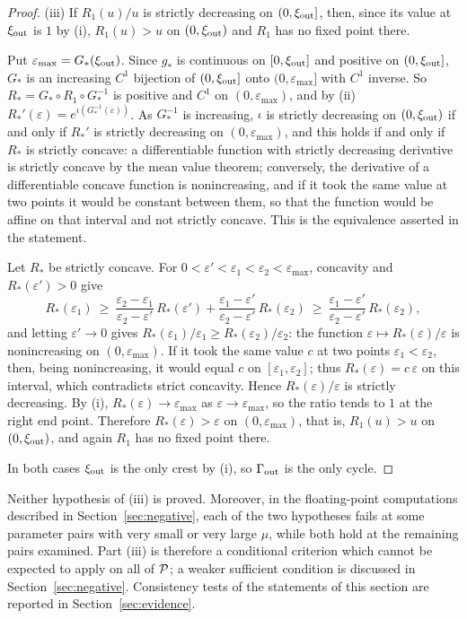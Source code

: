 \begin{proof}
(iii) If $R_1(u)/u$ is strictly decreasing on $(0,\xi_{\rm out}]$, then, since its value at $\xi_{\rm out}$ is $1$ by (i), $R_1(u)>u$ on $(0,\xi_{\rm out})$ and $R_1$ has no fixed point there.

Put $\varepsilon_{\max}=G_\ast(\xi_{\rm out})$. Since $g_\ast$ is continuous on $[0,\xi_{\rm out}]$ and positive on $(0,\xi_{\rm out}]$, $G_\ast$ is an increasing $C^1$ bijection of $(0,\xi_{\rm out}]$ onto $(0,\varepsilon_{\max}]$ with $C^1$ inverse. So $R_\ast=G_\ast\circ R_1\circ G_\ast^{-1}$ is positive and $C^1$ on $(0,\varepsilon_{\max})$, and by (ii) $R_\ast'(\varepsilon)=e^{\iota(G_\ast^{-1}(\varepsilon))}$. As $G_\ast^{-1}$ is increasing, $\iota$ is strictly decreasing on $(0,\xi_{\rm out})$ if and only if $R_\ast'$ is strictly decreasing on $(0,\varepsilon_{\max})$, and this holds if and only if $R_\ast$ is strictly concave: a differentiable function with strictly decreasing derivative is strictly concave by the mean value theorem; conversely, the derivative of a differentiable concave function is nonincreasing, and if it took the same value at two points it would be constant between them, so that the function would be affine on that interval and not strictly concave. This is the equivalence asserted in the statement.

Let $R_\ast$ be strictly concave. For $0<\varepsilon'<\varepsilon_1<\varepsilon_2<\varepsilon_{\max}$, concavity and $R_\ast(\varepsilon')>0$ give
\[
R_\ast(\varepsilon_1)\ \ge\ \frac{\varepsilon_2-\varepsilon_1}{\varepsilon_2-\varepsilon'}\,R_\ast(\varepsilon')+\frac{\varepsilon_1-\varepsilon'}{\varepsilon_2-\varepsilon'}\,R_\ast(\varepsilon_2)\ \ge\ \frac{\varepsilon_1-\varepsilon'}{\varepsilon_2-\varepsilon'}\,R_\ast(\varepsilon_2),
\]
and letting $\varepsilon'\to0$ gives $R_\ast(\varepsilon_1)/\varepsilon_1\ge R_\ast(\varepsilon_2)/\varepsilon_2$: the function $\varepsilon\mapsto R_\ast(\varepsilon)/\varepsilon$ is nonincreasing on $(0,\varepsilon_{\max})$. If it took the same value $c$ at two points $\varepsilon_1<\varepsilon_2$, then, being nonincreasing, it would equal $c$ on $[\varepsilon_1,\varepsilon_2]$; thus $R_\ast(\varepsilon)=c\,\varepsilon$ on this interval, which contradicts strict concavity. Hence $R_\ast(\varepsilon)/\varepsilon$ is strictly decreasing. By (i), $R_\ast(\varepsilon)\to\varepsilon_{\max}$ as $\varepsilon\to\varepsilon_{\max}$, so the ratio tends to $1$ at the right end point. Therefore $R_\ast(\varepsilon)>\varepsilon$ on $(0,\varepsilon_{\max})$, that is, $R_1(u)>u$ on $(0,\xi_{\rm out})$, and again $R_1$ has no fixed point there.

In both cases $\xi_{\rm out}$ is the only crest by (i), so $\Gamma_{\rm out}$ is the only cycle.
\end{proof}
Neither hypothesis of (iii) is proved. Moreover, in the floating-point computations described in Section~\ref{sec:negative}, each of the two hypotheses fails at some parameter pairs with very small or very large $\mu$, while both hold at the remaining pairs examined. Part (iii) is therefore a conditional criterion which cannot be expected to apply on all of $\mathcal P$; a weaker sufficient condition is discussed in Section~\ref{sec:negative}. Consistency tests of the statements of this section are reported in Section~\ref{sec:evidence}.

